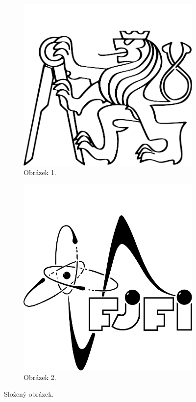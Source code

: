		\begin{figure}[!hbt]
		\centering
		\begin{subfigure}[b]{0.2\textwidth}
		       \includegraphics[width=\textwidth]{img/cvut}
		       \caption{Obrázek 1.}
		       \label{fig:slozeny1}
		       \end{subfigure}
		\hspace{2cm}
		\begin{subfigure}[b]{0.2\textwidth}
		       \includegraphics[width=\textwidth]{img/fjfi}
		       \caption{Obrázek 2.}
			   \label{fig:slozeny2}
		\end{subfigure}
		\caption{Složený obrázek.}
		\label{fig:slozeny}
		\end{figure}		
			

